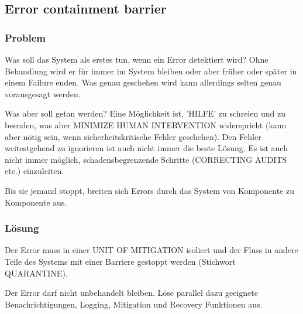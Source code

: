 \subsection{Error containment barrier}


\subsubsection*{Problem}


Was soll das System als erstes tun, wenn ein Error detektiert wird? Ohne Behandlung wird er für immer im System bleiben oder aber früher oder später in einem Failure enden. Was genau geschehen wird kann allerdings selten genau vorausgesagt werden.

Was aber soll getan werden? Eine Möglichkeit ist, 'HILFE' zu schreien und zu beenden, was aber MINIMIZE HUMAN INTERVENTION widerspricht (kann aber nötig sein, wenn sicherheitskritische Fehler geschehen). Den Fehler weitestgehend zu ignorieren ist auch nicht immer die beste Lösung. Es ist auch nicht immer möglich, schadensbegrenzende Schritte (CORRECTING AUDITS etc.) einzuleiten.

Bis sie jemand stoppt, breiten sich Errors durch das System von Komponente zu Komponente aus.

\subsubsection*{Lösung}

Der Error muss in einer UNIT OF MITIGATION isoliert und der Fluss in andere Teile des Systems mit einer Barriere gestoppt werden (Stichwort QUARANTINE).

Der Error darf nicht unbehandelt bleiben. Löse parallel dazu geeignete Benachrichtigungen, Logging, Mitigation und Recovery Funktionen aus.
